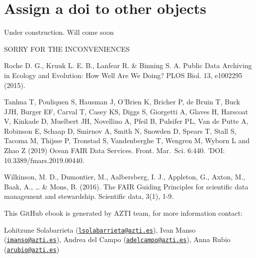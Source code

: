 \documentclass[
]{book}
\begin{document}
\hypertarget{assign-a-doi-to-other-objects}{%
\chapter{Assign a doi to other objects}\label{assign-a-doi-to-other-objects}}

Under construction. Will come soon

SORRY FOR THE INCONVENIENCES

Roche D. G., Kruuk L. E. B., Lanfear R. \& Binning S. A. Public Data Archiving in Ecology and Evolution: How Well Are We Doing? PLOS Biol. 13, e1002295 (2015).

Tanhua T, Pouliquen S, Hausman J, O'Brien K, Bricher P, de Bruin T, Buck JJH, Burger EF, Carval T, Casey KS, Diggs S, Giorgetti A, Glaves H, Harscoat V, Kinkade D, Muelbert JH, Novellino A, Pfeil B, Pulsifer PL, Van de Putte A, Robinson E, Schaap D, Smirnov A, Smith N, Snowden D, Spears T, Stall S, Tacoma M, Thijsse P, Tronstad S, Vandenberghe T, Wengren M, Wyborn L and Zhao Z (2019) Ocean FAIR Data Services. Front. Mar.~Sci. 6:440. 'DOI: 10.3389/fmars.2019.00440.

Wilkinson, M. D., Dumontier, M., Aalbersberg, I. J., Appleton, G., Axton, M., Baak, A., \ldots{} \& Mons, B. (2016). The FAIR Guiding Principles for scientific data management and stewardship. Scientific data, 3(1), 1-9.

This GitHub ebook is generated by AZTI team, for more information contact:

Lohitzune Solabarrieta (\href{mailto:lsolabarrieta@azti.es}{\nolinkurl{lsolabarrieta@azti.es}}),
Ivan Manso (\href{mailto:imanso@azti.es}{\nolinkurl{imanso@azti.es}}),
Andrea del Campo (\href{mailto:adelcampo@azti.es}{\nolinkurl{adelcampo@azti.es}}),
Anna Rubio (\href{mailto:arubio@azti.es}{\nolinkurl{arubio@azti.es}})

  
\end{document}
